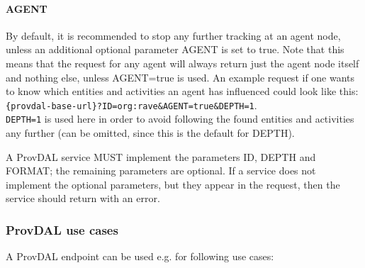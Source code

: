 \paragraph{AGENT}
By default, it is recommended to stop any further tracking at an agent node, unless an additional optional parameter AGENT is set to true. Note that this means that the request for any agent will always return just the agent node itself and nothing else, unless AGENT=true is used. An example request if one wants to know which entities and activities an agent has influenced could look like this:\\\texttt{\{provdal-base-url\}?ID=org:rave\&AGENT=true\&DEPTH=1}.\\
\texttt{DEPTH=1} is used here in order to avoid following the found entities and activities any further (can be omitted, since this is the default for DEPTH).
\newline



A ProvDAL service MUST implement the parameters ID, DEPTH and FORMAT; the remaining parameters are optional.
If a service does not implement the optional parameters, but they appear in the request, then the service should return with an error.


\subsubsection{ProvDAL use cases}

A ProvDAL endpoint can be used e.g. for following use cases:

